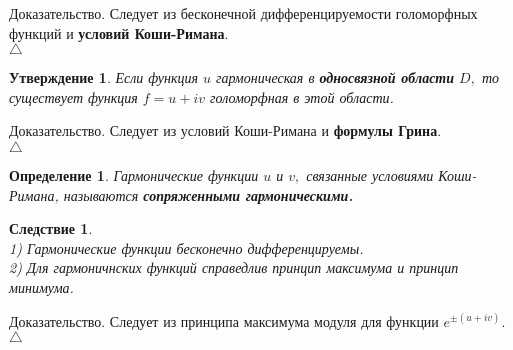 \documentclass[12pt,a4paper]{article}
\theoremstyle{plain}   \newtheorem{Pro}{Задача}
\newtheorem{Sta}{Утверждение}
\newtheorem{Def}{Определение}
\newtheorem{Cor}{Следствие}
\begin{document}
{\Large Доказательство.}
Следует из бесконечной дифференцируемости голоморфных
функций и
{\bfseries условий Коши-Римана}.
\\
$ \triangle $
\begin{Sta}
Если функция
$ u $
гармоническая в
{\bfseries односвязной области}
$ D , $
то существует функция
$ f=u+iv $
голоморфная в этой области.
\end{Sta}
{\Large Доказательство.}
Следует из условий Коши-Римана и
{\bfseries формулы Грина}.
\\
$ \triangle $
\begin{Def}
Гармонические функции
$ u $
и
$ v , $
связанные условиями Коши-Римана, называются
{\bfseries сопряженными гармоническими.}
\end{Def}
\begin{Cor}
$ \; $\\
1) Гармонические функции бесконечно дифференцируемы. \\
2) Для гармоничнских функций справедлив принцип
максимума и принцип минимума.
\end{Cor}
{\Large Доказательство.}
Следует из принципа максимума модуля для функции
$ e^{\pm (u+iv)}. $
\\
$ \triangle $
\\
\end{document}
